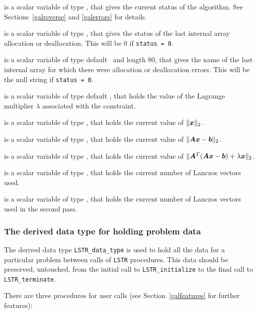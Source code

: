 \documentclass{galahad}
\newcommand{\packagename}{LS\-TR}
\begin{document}
\begin{description}
 is a scalar variable of type \integer, that gives the
current status of the algorithm. See Sections~\ref{galreverse} and
\ref{galerrors} for details.

 is a scalar variable of type \integer,
that gives the status of the last internal array allocation
or deallocation. This will be 0 if {\tt status = 0}.

 is a scalar variable of type default \character\
and length 80, that  gives the name of the last internal array
for which there were allocation or deallocation errors.
This will be the null string if {\tt status = 0}.

 is a scalar variable of type default
\realdp, that holds the
value of the Lagrange multiplier $\lambda$ associated with the constraint.

 is a scalar variable of type \realdp,
that holds the current value of $\|{\bm{x}}\|_2$.

 is a scalar variable of type \realdp,
that holds the current value of $\|{\bm{A}}{\bm{x}}-{\bm{b}}\|_2$.

 is a scalar variable of type \realdp,
that holds the current value of
$\|{\bm{A}}^T ( {\bm{A}} {\bm{x}} - \bm b ) + \lambda {\bm{x}} \|_2$.

 is a scalar variable of type \integer, that holds the
current number of Lanczos vectors used.

 is a scalar variable of type \integer, that holds the
current number of Lanczos vectors used in the second pass.

\end{description}


\subsubsection{The derived data type for holding problem data}\label{typedata}
The derived data type
{\tt \packagename\_data\_type}
is used to hold all the data for a particular problem between calls of
{\tt \packagename} procedures.
This data should be preserved, untouched, from the initial call to
{\tt \packagename\_initialize}
to the final call to
{\tt \packagename\_terminate}.


\galarguments
There are three procedures for user calls
(see Section~\ref{galfeatures} for further features):
\end{document}
